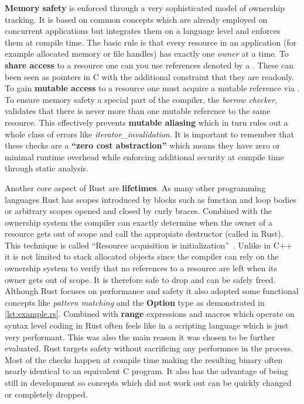 \textbf{Memory safety} is enforced through a very sophisticated model of ownership tracking. It is based on common concepts which are already employed on concurrent applications but integrates them on a language level and enforces them at compile time. The basic rule is that every resource in an application (for example allocated memory or file handles) has exactly one \textit{owner} at a time. To \textbf{share access} to a resource one can you use references denoted by a \shinline{\&}. These can been seen as pointers in C with the additional constraint that they are readonly. To gain \textbf{mutable access} to a resource one must acquire a mutable reference via . To ensure memory safety a special part of the compiler, the \textit{borrow checker}, validates that there is never more than one mutable reference to the same resource. This effectively prevents \textbf{mutable aliasing} which in turn rules out a whole class of errors like \textit{\gls{iterator_invalidation}}. It is important to remember that these checks are a \textbf{``zero cost abstraction''} which means they have zero or minimal runtime overhead while enforcing additional security at compile time through static analysis.

Another core aspect of Rust are \textbf{lifetimes}. As many other programming languages Rust has scopes introduced by blocks such as function and loop bodies or arbitrary scopes opened and closed by curly braces. Combined with the ownership system the compiler can exactly determine when the owner of a resource gets out of scope and call the appropiate destructor (called  in Rust). This technique is called ``Resource acquisition is initialization''~\cite[p. 389]{evolution_c++}. Unlike in C++ it is not limited to stack allocated objects since the compiler can rely on the ownership system to verify that no references to a resource are left when its owner gets out of scope. It is therefore safe to drop and can be safely freed.
\\


Although Rust focuses on performance and safety it also adopted some functional concepts like \textit{pattern matching} and the \textbf{Option} type as demonstrated in \autoref{lst:example.rs}. Combined with \textbf{range} expressions and macros which operate on syntax level coding in Rust often feels like in a scripting language which is just very performant. This was also the main reason it was chosen to be further evaluated. Rust targets safety without sacrificing any performnce in the process. Most of the checks happen at compile time making the resulting binary often nearly identical to an equivalent C program. It also has the advantage of being still in development so concepts which did not work out can be quickly changed or completely dropped.


